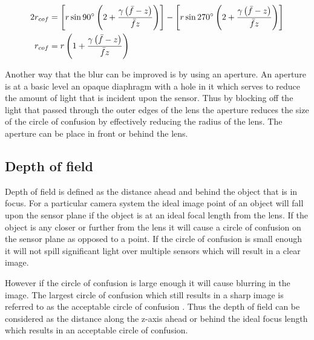 \begin{align}
	2 r_{cof} &= \left[r \sin 90 ^{\circ} \left( 2 + \frac{\gamma \left( \bar{f} - z \right)}{\bar{f} z} \right) \right] - \left[r \sin 270 ^{\circ} \left( 2 + \frac{\gamma \left( \bar{f} - z \right)}{\bar{f} z} \right) \right] \\
	r_{cof}&=r \left( 1 + \frac{\gamma \left( \bar{f} - z \right)}{\bar{f}z} \right)
\end{align}

Another way that the blur can be improved is by using an aperture. An aperture is at a basic level an opaque diaphragm with a hole in it which serves to reduce the amount of light that is incident upon the sensor. Thus by blocking off the light that passed through the outer edges of the lens the aperture reduces the size of the circle of confusion by effectively reducing the radius of the lens. The aperture can be place in front or behind the lens. 

\subsection{Depth of field}
Depth of field is defined as the distance ahead and behind the object that is in focus. For a particular camera system the ideal image point of an object will fall upon the sensor plane if the object is at an ideal focal length from the lens. If the object is any closer or further from the lens it will cause a circle of confusion on the sensor plane as opposed to a point. If the circle of confusion is small enough it will not spill significant light over multiple sensors which will result in a clear image.%

However if the circle of confusion is large enough it will cause blurring in the image. The largest circle of confusion which still results in a sharp image is referred to as the acceptable circle of confusion \cite{sutton2009image}. Thus the depth of field can be considered as the distance along the z-axis ahead or behind the ideal focus length which results in an acceptable circle of confusion.

